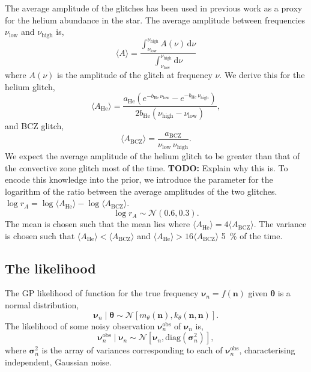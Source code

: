 \documentclass[linenumbers,modern]{aastex631dm}
\newcommand{\helium}{\mathrm{He}}
\newcommand{\bcz}{\mathrm{BCZ}}
\newcommand{\dd}{\mathrm{d}}
\newcommand{\todo}[1]{{\color{todo} \textbf{TODO:} #1}}
\begin{document}
The average amplitude of the glitches has been used in previous work as a proxy
for the helium abundance in the star. The average amplitude between frequencies
\(\nu_\mathrm{low}\) and \(\nu_\mathrm{high}\) is,
%
\begin{equation}
    \langle A \rangle = \frac{
        \int_{\nu_\mathrm{low}}^{\nu_\mathrm{high}} A(\nu) \, \dd \nu
    }{
        \int_{\nu_\mathrm{low}}^{\nu_\mathrm{high}} \dd \nu
    }
\end{equation}
%
where \(A(\nu)\) is the amplitude of the glitch at frequency \(\nu\). We derive
this for the helium glitch,
%
\begin{equation}
    \langle A_\helium \rangle = \frac{
        a_\helium \left(
            e^{- b_\helium \, \nu_\mathrm{low}}
            - e^{- b_\helium \, \nu_\mathrm{high}}
        \right)
    }{2 b_\helium (\nu_\mathrm{high} - \nu_\mathrm{low})},
\end{equation}
%
and BCZ glitch,
%
\begin{equation}
    \langle A_\bcz \rangle
    = \frac{a_\bcz}{\nu_\mathrm{low} \, \nu_\mathrm{high}}.
\end{equation}
%
We expect the average amplitude of the helium glitch to be greater than that of
the convective zone glitch most of the time. \todo{Explain why this is.} To
encode this knowledge into the prior, we introduce the parameter for the
logarithm of the ratio between the average amplitudes of the two glitches.
\(\log r_A = \log \langle A_\helium \rangle - \log \langle A_\bcz \rangle\).
%
\begin{equation}
    \log r_A \sim \mathcal{N}(0.6, 0.3).
\end{equation}
%
The mean is chosen such that the mean lies where
\(\langle A_\helium \rangle = 4 \langle A_\bcz \rangle\). The variance is
chosen such that \(\langle A_\helium \rangle < \langle A_\bcz \rangle\) and
\(\langle A_\helium \rangle > 16 \langle A_\bcz \rangle\) \SI{5}{\percent} of
the time.


\subsection{The likelihood}

The GP likelihood of function for the true frequency \(\bm \nu_n = f(\bm n)\)
given \(\bm\theta\) is a normal distribution,
%
\begin{equation}
    \bm \nu_n \mid \bm\theta \sim
    \mathcal{N}\left[m_\theta(\bm n), k_\theta(\bm n, \bm n)\right].
\end{equation}
%
The likelihood of some noisy observation \(\bm \nu^\mathrm{obs}_n\) of
\(\bm \nu_n\) is,
%
\begin{equation}
    \bm\nu^\mathrm{obs}_n \mid \bm \nu_n
    \sim \mathcal{N}\left[\bm \nu_n, \mathrm{diag}(\bm\sigma_n^2)\right],
\end{equation}
%
where \(\bm\sigma_n^2\) is the array of variances corresponding to
each of \(\bm\nu^\mathrm{obs}_n\), characterising independent, Gaussian noise.
\end{document}
